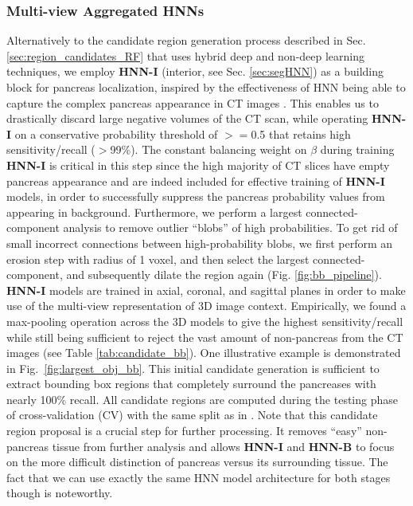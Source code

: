 \documentclass[journal]{IEEEtran}
\begin{document}
\subsubsection{Multi-view Aggregated HNNs}\label{sec:localizationHNN}
\label{sec:region_candidates} 
Alternatively to the candidate region generation process described in Sec. \ref{sec:region_candidates_RF} that uses hybrid deep and non-deep learning techniques, we employ \textbf{HNN-I} (interior, see Sec. \ref{sec:segHNN}) as a building block for pancreas localization, inspired by the effectiveness of HNN being able to capture the complex pancreas appearance in CT images \cite{roth2016spatial}. This enables us to drastically discard large negative volumes of the CT scan, while operating \textbf{HNN-I} on a conservative probability threshold of $>=$0.5 that retains high sensitivity/recall ($>$99\%). The constant balancing weight on $\beta$ during training \textbf{HNN-I} is critical in this step since the high majority of CT slices have empty pancreas appearance and are indeed included for effective training of \textbf{HNN-I} models, in order to successfully suppress the pancreas probability values from appearing in background. 
Furthermore, we perform a largest connected-component analysis to remove outlier ``blobs'' of high probabilities. To get rid of small incorrect connections between high-probability blobs, we first perform an erosion step with radius of 1 voxel, and then select the largest connected-component, and subsequently dilate the region again (Fig. \ref{fig:bb_pipeline}). 
\textbf{HNN-I} models are trained in axial, coronal, and sagittal planes in order to make use of the multi-view representation of 3D image context. Empirically, we found a max-pooling operation across the 3D models to give the highest sensitivity/recall while still being sufficient to reject the vast amount of non-pancreas from the CT images (see Table \ref{tab:candidate_bb}). One illustrative example is demonstrated in Fig.~\ref{fig:largest_obj_bb}.
This initial candidate generation is sufficient to extract bounding box regions that completely surround the pancreases with nearly 100\% recall. All candidate regions are computed during the testing phase of cross-validation (CV) with the same split as in \cite{roth2015deeporgan}. 
Note that this candidate region proposal is a crucial step for further processing. It removes ``easy'' non-pancreas tissue from further analysis and allows \textbf{HNN-I} and \textbf{HNN-B} to focus on  the more difficult distinction of pancreas versus its surrounding tissue. The fact that we can use exactly the same HNN model architecture for both stages though is noteworthy.
\end{document}
